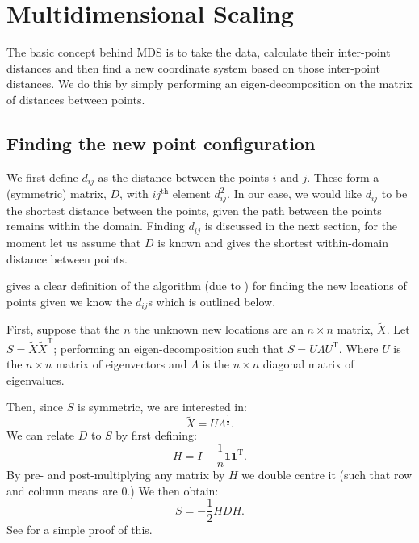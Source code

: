 \documentclass[a4paper,10pt]{article}
\newcommand{\tr}[1]{#1^{\text{T}}}
\newcommand{\cross}{\times}
\begin{document}
\section{Multidimensional Scaling}

The basic concept behind MDS is to take the data, calculate their inter-point distances and then find a new coordinate system based on those inter-point distances. We do this by simply performing an eigen-decomposition on the matrix of distances between points.

\subsection{Finding the new point configuration}

We first define $d_{ij}$ as the distance between the points $i$ and $j$. These form a (symmetric) matrix, $D$, with $ij^{\text{th}}$ element $d^2_{ij}$. In our case, we would like $d_{ij}$ to be the shortest distance between the points, given the path between the points remains within the domain. Finding $d_{ij}$ is discussed in the next section, for the moment let us assume that $D$ is known and gives the shortest within-domain distance between points.

\cite{diaconis08} gives a clear definition of the algorithm (due to \cite{schoenberg35}) for finding the new locations of points given we know the $d_{ij}$s which is outlined below.

First, suppose that the $n$ the unknown new locations are an $n \times n$ matrix, $\tilde{X}$. Let $S=\tilde{X}\tr{\tilde{X}}$; performing an eigen-decomposition such that $S=U\Lambda\tr{U}$. Where $U$ is the $n \cross n$ matrix of eigenvectors and $\Lambda$ is the $n \cross n$ diagonal matrix of eigenvalues.

Then, since $S$ is symmetric, we are interested in:
\begin{equation}
\tilde{X}=U\Lambda^{\frac{1}{2}}.
\end{equation}
We can relate $D$ to $S$ by first defining:
\begin{equation}
H = I-\frac{1}{n}\mathbf{1}\tr{\mathbf{1}}.
\end{equation}
By pre- and post-multiplying any matrix by $H$ we double centre it (such that row and column means are 0.) We then obtain:
\begin{equation}
S = -\frac{1}{2}HDH.
\end{equation}
See \cite{diaconis08} for a simple proof of this.
\end{document}

